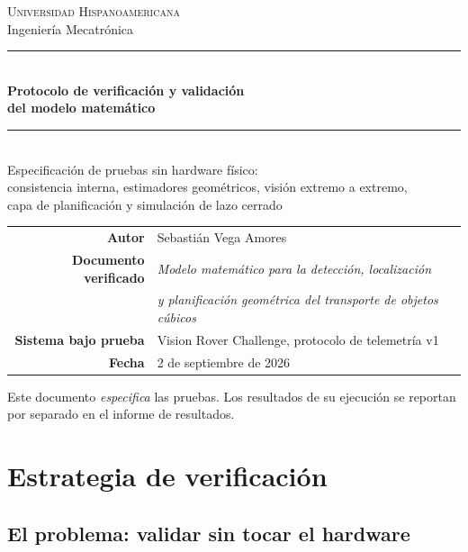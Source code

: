 \documentclass[11pt,a4paper]{article}
\begin{document}
\begin{titlepage}
\centering
\vspace*{2cm}
{\Large\scshape Universidad Hispanoamericana}\\[0.2cm]
{\large Ingeniería Mecatrónica}\\[2.2cm]

\rule{\linewidth}{1.2pt}\\[0.4cm]
{\LARGE\bfseries Protocolo de verificación y validación\\[0.18cm]
del modelo matemático}\\[0.4cm]
\rule{\linewidth}{1.2pt}\\[0.8cm]

{\large Especificación de pruebas sin hardware físico:\\
consistencia interna, estimadores geométricos, visión extremo a extremo,\\
capa de planificación y simulación de lazo cerrado}\\[2.2cm]

\begin{tabular}{rl}
\textbf{Autor} & Sebastián Vega Amores\\[0.12cm]
\textbf{Documento verificado} & \textit{Modelo matemático para la detección, localización}\\
 & \textit{y planificación geométrica del transporte de objetos cúbicos}\\[0.12cm]
\textbf{Sistema bajo prueba} & Vision Rover Challenge, protocolo de telemetría v1\\[0.12cm]
\textbf{Fecha} & 2 de septiembre de 2026\\
\end{tabular}

\vfill
{\small Este documento \emph{especifica} las pruebas. Los resultados de su ejecución se
reportan por separado en el informe de resultados.}
\end{titlepage}

\tableofcontents
\newpage

\section{Estrategia de verificación}

\subsection{El problema: validar sin tocar el hardware}
\end{document}
